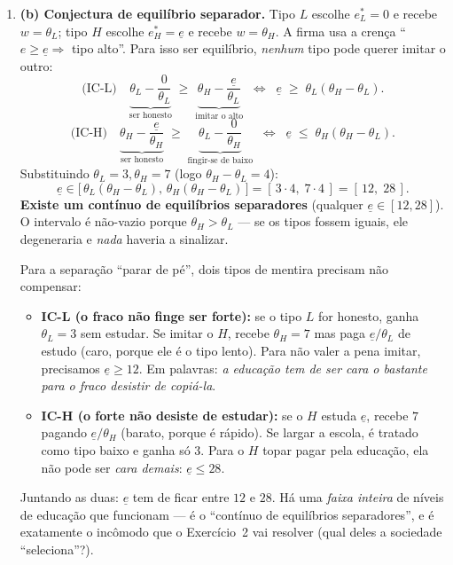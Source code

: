 \documentclass[11pt,a4paper]{article}
\begin{document}
\begin{enumerate}[leftmargin=2em,itemsep=4pt]
\item \textbf{(b) Conjectura de equilíbrio separador.} Tipo $L$ escolhe $e^*_L=0$ e recebe
$w=\theta_L$; tipo $H$ escolhe $e^*_H=\underline e$ e recebe $w=\theta_H$. A firma usa a
crença ``$e\ge\underline e\Rightarrow$ tipo alto''. Para isso ser equilíbrio, \emph{nenhum}
tipo pode querer imitar o outro:
\[
\text{(IC-L)}\quad
\underbrace{\theta_L-\frac{0}{\theta_L}}_{\text{ser honesto}}
\;\ge\;
\underbrace{\theta_H-\frac{\underline e}{\theta_L}}_{\text{imitar o alto}}
\;\;\Longleftrightarrow\;\;
\underline e \;\ge\; \theta_L(\theta_H-\theta_L). \tag{1.2}
\]
\[
\text{(IC-H)}\quad
\underbrace{\theta_H-\frac{\underline e}{\theta_H}}_{\text{ser honesto}}
\;\ge\;
\underbrace{\theta_L-\frac{0}{\theta_H}}_{\text{fingir-se de baixo}}
\;\;\Longleftrightarrow\;\;
\underline e \;\le\; \theta_H(\theta_H-\theta_L). \tag{1.3}
\]
Substituindo $\theta_L=3,\theta_H=7$ (logo $\theta_H-\theta_L=4$):
\[
\boxed{\;\underline e \in \big[\,\theta_L(\theta_H-\theta_L),\,\theta_H(\theta_H-\theta_L)\,\big]
= [\,3\cdot4,\;7\cdot4\,] = [\,12,\;28\,].\;} \tag{1.4}
\]
\textbf{Existe um contínuo de equilíbrios separadores} (qualquer $\underline e\in[12,28]$). O
intervalo é não-vazio porque $\theta_H>\theta_L$ — se os tipos fossem iguais, ele degeneraria
e \emph{nada} haveria a sinalizar.

\begin{empalavras}
Para a separação ``parar de pé'', dois tipos de mentira precisam não compensar:
\begin{itemize}[leftmargin=1.3em,itemsep=1pt,topsep=2pt]
\item \textbf{IC-L (o fraco não finge ser forte):} se o tipo $L$ for honesto, ganha
$\theta_L=3$ sem estudar. Se imitar o $H$, recebe $\theta_H=7$ mas paga $\underline e/\theta_L$
de estudo (caro, porque ele é o tipo lento). Para não valer a pena imitar, precisamos
$\underline e\ge 12$. Em palavras: \emph{a educação tem de ser cara o bastante para o fraco
desistir de copiá-la}.
\item \textbf{IC-H (o forte não desiste de estudar):} se o $H$ estuda $\underline e$, recebe
$7$ pagando $\underline e/\theta_H$ (barato, porque é rápido). Se largar a escola, é tratado
como tipo baixo e ganha só $3$. Para o $H$ topar pagar pela educação, ela não pode ser
\emph{cara demais}: $\underline e\le 28$.
\end{itemize}
Juntando as duas: $\underline e$ tem de ficar entre $12$ e $28$. Há uma \emph{faixa inteira} de
níveis de educação que funcionam — é o ``contínuo de equilíbrios separadores'', e é exatamente
o incômodo que o Exercício~2 vai resolver (qual deles a sociedade ``seleciona''?).
\end{empalavras}


\end{enumerate}
\end{document}
